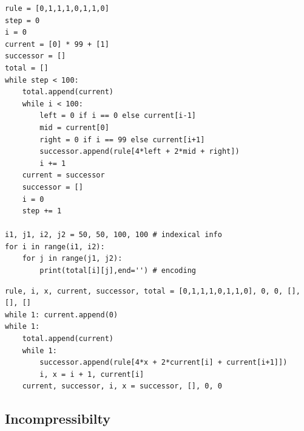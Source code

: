 \newpage

\begin{lstlisting}[caption={A short program implementing Rule 110, together with indexical info. It prints a quite chaotic looking string of length 2500.}]
rule = [0,1,1,1,0,1,1,0]
step = 0 
i = 0
current = [0] * 99 + [1]
successor = []
total = []
while step < 100:
	total.append(current)
	while i < 100:
		left = 0 if i == 0 else current[i-1]
		mid = current[0]
		right = 0 if i == 99 else current[i+1]
		successor.append(rule[4*left + 2*mid + right])
		i += 1
	current = successor
	successor = []
	i = 0
	step += 1

i1, j1, i2, j2 = 50, 50, 100, 100 # indexical info
for i in range(i1, i2):
	for j in range(j1, j2):
		print(total[i][j],end='') # encoding
\end{lstlisting}

\begin{lstlisting}[caption={A short program generating an infinite universe of Rule 110. The question of how indexical information works in an infinite universe is addressed later in the document.}]
rule, i, x, current, successor, total = [0,1,1,1,0,1,1,0], 0, 0, [], [], []
while 1: current.append(0)
while 1:
	total.append(current)
	while 1:
		successor.append(rule[4*x + 2*current[i] + current[i+1]])
		i, x = i + 1, current[i]
	current, successor, i, x = successor, [], 0, 0
\end{lstlisting}

\newpage

\subsection{Incompressibilty}

